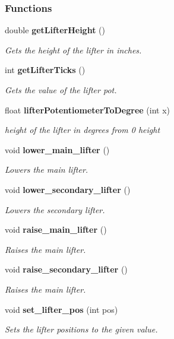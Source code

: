 \subsubsection*{Functions}
\begin{DoxyCompactItemize}
\item 
double \textbf{ get\+Lifter\+Height} ()
\begin{DoxyCompactList}\small\item\em Gets the height of the lifter in inches. \end{DoxyCompactList}\item 
int \textbf{ get\+Lifter\+Ticks} ()
\begin{DoxyCompactList}\small\item\em Gets the value of the lifter pot. \end{DoxyCompactList}\item 
float \textbf{ lifter\+Potentiometer\+To\+Degree} (int x)
\begin{DoxyCompactList}\small\item\em height of the lifter in degrees from 0 height \end{DoxyCompactList}\item 
void \textbf{ lower\+\_\+main\+\_\+lifter} ()
\begin{DoxyCompactList}\small\item\em Lowers the main lifter. \end{DoxyCompactList}\item 
void \textbf{ lower\+\_\+secondary\+\_\+lifter} ()
\begin{DoxyCompactList}\small\item\em Lowers the secondary lifter. \end{DoxyCompactList}\item 
void \textbf{ raise\+\_\+main\+\_\+lifter} ()
\begin{DoxyCompactList}\small\item\em Raises the main lifter. \end{DoxyCompactList}\item 
void \textbf{ raise\+\_\+secondary\+\_\+lifter} ()
\begin{DoxyCompactList}\small\item\em Raises the main lifter. \end{DoxyCompactList}\item 
void \textbf{ set\+\_\+lifter\+\_\+pos} (int pos)
\begin{DoxyCompactList}\small\item\em Sets the lifter positions to the given value. \end{DoxyCompactList}\item 

\end{DoxyCompactItemize}
